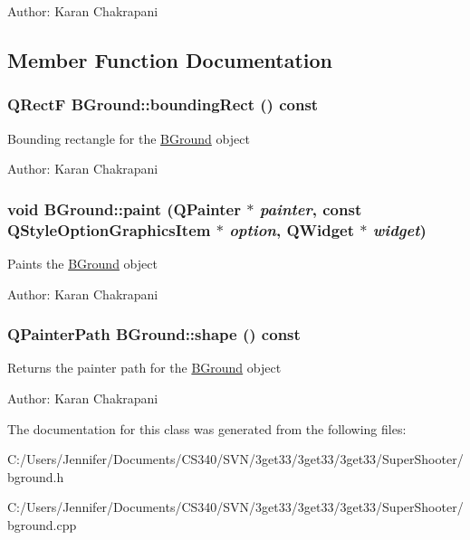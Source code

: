 Author: Karan Chakrapani 

\subsection{Member Function Documentation}
\hypertarget{class_b_ground_ac125d3f6c2f54c7196a7716734836bc9}{
\subsubsection[{boundingRect}]{\setlength{\rightskip}{0pt plus 5cm}QRectF BGround::boundingRect () const}}
\label{class_b_ground_ac125d3f6c2f54c7196a7716734836bc9}
Bounding rectangle for the \hyperlink{class_b_ground}{BGround} object

Author: Karan Chakrapani \hypertarget{class_b_ground_a806a00705841126f626e60ac76f6cbe6}{
\subsubsection[{paint}]{\setlength{\rightskip}{0pt plus 5cm}void BGround::paint (QPainter $\ast$ {\em painter}, \/  const QStyleOptionGraphicsItem $\ast$ {\em option}, \/  QWidget $\ast$ {\em widget})}}
\label{class_b_ground_a806a00705841126f626e60ac76f6cbe6}
Paints the \hyperlink{class_b_ground}{BGround} object

Author: Karan Chakrapani \hypertarget{class_b_ground_a01af4fa4c14a465fc37d9f3ae2e22a73}{
\subsubsection[{shape}]{\setlength{\rightskip}{0pt plus 5cm}QPainterPath BGround::shape () const}}
\label{class_b_ground_a01af4fa4c14a465fc37d9f3ae2e22a73}
Returns the painter path for the \hyperlink{class_b_ground}{BGround} object

Author: Karan Chakrapani 

The documentation for this class was generated from the following files:\begin{DoxyCompactItemize}
\item 
C:/Users/Jennifer/Documents/CS340/SVN/3get33/3get33/3get33/SuperShooter/bground.h\item 
C:/Users/Jennifer/Documents/CS340/SVN/3get33/3get33/3get33/SuperShooter/bground.cpp\end{DoxyCompactItemize}
